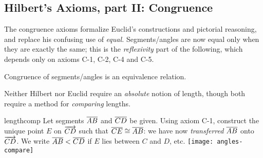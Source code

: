 \clearpage



\subsection{Hilbert's Axioms, part II: Congruence}\label{sec:hilbert2}

The congruence axioms formalize Euclid's constructions and pictorial reasoning, and replace his confusing use of \emph{equal.} Segments/angles are now equal only when they are exactly the same; this is the \emph{reflexivity} part of the following, which depends only on axioms C-1, C-2, C-4 and C-5.

\begin{lemm}{}{}
Congruence of segments/angles is an equivalence relation.
\end{lemm}



Neither Hilbert nor Euclid require an \emph{absolute} notion of length, though both require a method for \emph{comparing} lengths. 


\begin{defn}[lower separated=false, sidebyside, sidebyside align=top seam, sidebyside gap=0pt, righthand width=0.35\linewidth]{}{lengthcomp}
Let segments $\overline{AB}$ and $\overline{CD}$ be given.\smallbreak
Using axiom C-1, construct the unique point $E$ on $\overrightarrow{CD}$ such that $\overline{CE}\cong\overline{AB}$: we have now \emph{transferred} $\overline{AB}$ onto $\overrightarrow{CD}$.\smallbreak
We write $\overline{AB}<\overline{CD}$ if $E$ lies between $C$ and $D$, etc.
\tcblower
\flushright\texttt{[image: angles-compare]}
\end{defn}

